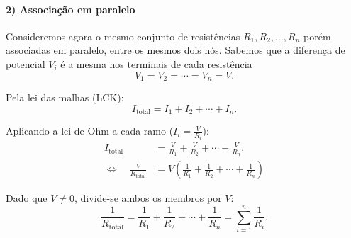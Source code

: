 \paragraph{2) Associação em paralelo}

Consideremos agora o mesmo conjunto de resistências $R_1, R_2, \dots, R_n$ porém associadas em paralelo, entre os mesmos dois nós.
Sabemos que a diferença de potencial $V_i$ é a mesma nos terminais de cada resistência
\begin{equation*}
	V_1 = V_2 = \cdots = V_n = V.
\end{equation*}

Pela lei das malhas (LCK):
\begin{equation*}
	I_{\text{total}} = I_1 + I_2 + \cdots + I_n.
\end{equation*}


Aplicando a lei de Ohm a cada ramo ($I_i = \frac{V}{R_i}$):
\begin{align*}
	I_{\text{total}} & = \frac{V}{R_1} + \frac{V}{R_2} + \cdots + \frac{V}{R_n}.
	\\\Leftrightarrow \quad \frac{V}{R_{\text{total}}} &=  V\left(\frac{1}{R_1} + \frac{1}{R_2}+ \cdots + \frac{1}{R_n}\right)
\end{align*}


Dado que $V \neq 0$, divide-se ambos os membros por $V$:
\begin{equation*}
	\frac{1}{R_{\text{total}}} = \frac{1}{R_1} + \frac{1}{R_2} + \cdots + \frac{1}{R_n}
	= \sum_{i=1}^{n}\frac{1}{R_i}.
\end{equation*}
